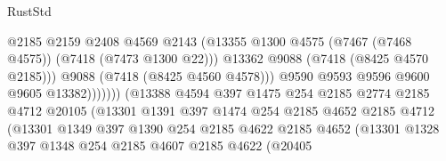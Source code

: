 \begin{lexlean}{RustStd}
\begin{coremodule}
                                              @2185
                                              @2159
                                              @2408
                                              @4569
                                              @2143
                                              (@13355
                                                @1300
                                                @4575
                                                (@7467 (@7468 @4575))
                                                (@7418 (@7473 @1300 @22)))
                                              @13362
                                              @9088
                                              (@7418 (@8425 @4570 @2185)))
                                            @9088
                                            (@7418 (@8425 @4560 @4578)))
                                          @9590
                                          @9593
                                          @9596
                                          @9600
                                          @9605
                                          @13382)))))))
                            (@13388
                              @4594
                              @397
                              @1475
                              @254
                              @2185
                              @2774
                              @2185
                              @4712
                              @20105
                              (@13301
                                @1391
                                @397
                                @1474
                                @254
                                @2185
                                @4652
                                @2185
                                @4712
                                (@13301
                                  @1349
                                  @397
                                  @1390
                                  @254
                                  @2185
                                  @4622
                                  @2185
                                  @4652
                                  (@13301
                                    @1328
                                    @397
                                    @1348
                                    @254
                                    @2185
                                    @4607
                                    @2185
                                    @4622
                                    (@20405

\end{coremodule}
\end{lexlean}
